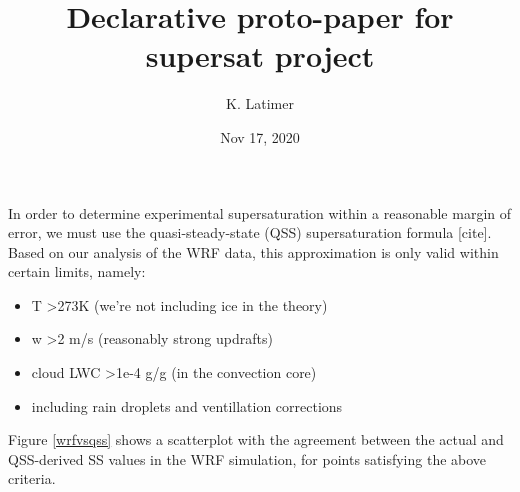 \documentclass{article}
\title{Declarative proto-paper for supersat project}
\author{K. Latimer}
\date{Nov 17, 2020}
\begin{document}
\maketitle

In order to determine experimental supersaturation within a reasonable margin of error, we must use the quasi-steady-state (QSS) supersaturation formula [cite]. Based on our analysis of the WRF data, this approximation is only valid within certain limits, namely:
\begin{itemize}
	\item T \textgreater  273K (we're not including ice in the theory)
	\item w \textgreater  2 m/s (reasonably strong updrafts)
	\item cloud LWC \textgreater  1e-4 g/g (in the convection core)
	\item including rain droplets and ventillation corrections
\end{itemize}

Figure \ref{wrfvsqss} shows a scatterplot with the agreement between the actual and QSS-derived SS values in the WRF simulation, for points satisfying the above criteria.

\clearpage
\newpage
\end{document}
